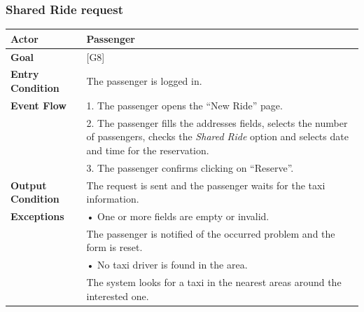 \documentclass{article}
\begin{document}
\subsubsection{Shared Ride request}
\begin{tabular}{| l | p{8cm} |}
\hline
\textbf{Actor}      &       Passenger \\
\hline
\textbf{Goal}       &       [G8]\\
\hline
\textbf{Entry Condition} &  The passenger is logged in.\\
\hline
\textbf{Event Flow}     & 1.	The passenger opens the “New Ride” page.\\&
                                            2.	The passenger fills the addresses fields, selects the number of passengers, checks the \textit{Shared Ride} option and selects date and time for the reservation.\\&
                                            3.	The passenger confirms clicking on “Reserve”.\\
\hline
\textbf{Output Condition} & The request is sent and the passenger waits for the taxi information.\\
\hline
\textbf{Exceptions} &     •	One or more fields are empty or invalid.\\&

The passenger is notified of the occurred problem and the form is reset.\\&
• No taxi driver is found in the area.\\&
The system looks for a taxi in the nearest areas around the interested one.\\
\hline
\end{tabular}
\end{document}
